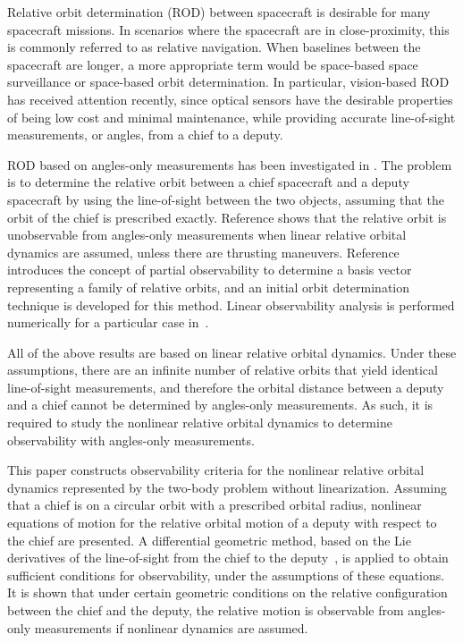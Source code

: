 Relative orbit determination (ROD) between spacecraft is desirable for many spacecraft missions. In scenarios where the spacecraft are in close-proximity, this is commonly referred to as relative navigation.
When baselines between the spacecraft are longer, a more appropriate term would be space-based space surveillance or space-based orbit determination. In particular, vision-based ROD has received attention recently, since optical sensors have the desirable properties of being low cost and minimal maintenance, while providing accurate line-of-sight measurements, or angles, from a chief to a deputy.

ROD based on angles-only measurements has been investigated in \cite{WofGelITAES09,PatLovPASFMM12}. The problem is to determine the relative orbit between a chief spacecraft and a deputy spacecraft by using the line-of-sight between the two objects, assuming that the orbit of the chief is prescribed exactly. Reference \cite{WofGelITAES09} shows that the relative orbit is unobservable from angles-only measurements when linear relative orbital dynamics are assumed, unless there are thrusting maneuvers. Reference~\cite{PatLovPASFMM12} introduces the concept of partial observability to determine a basis vector representing a family of relative orbits, and an initial orbit determination technique is developed for this method. Linear observability analysis is performed numerically for a particular case in~\cite{YimCraPASMM04}. 

All of the above results are based on linear relative orbital dynamics.
Under these assumptions, there are an infinite number of relative orbits that yield identical line-of-sight measurements, and therefore the orbital distance between a deputy and a chief cannot be determined by angles-only measurements. As such, it is required to study the nonlinear relative orbital dynamics to determine observability with angles-only measurements. 


This paper constructs observability criteria for the nonlinear relative orbital dynamics represented by the two-body problem without linearization. Assuming that a chief is on a circular orbit with a prescribed orbital radius, nonlinear equations of motion for the relative orbital motion of a deputy with respect to the chief are presented. A differential geometric method, based on the Lie derivatives of the line-of-sight from the chief to the deputy~\cite{HerKreITAC77}, is applied to obtain sufficient conditions for observability, under the assumptions of these equations. It is shown that under certain geometric conditions on the relative configuration between the chief and the deputy, the relative motion is observable from angles-only measurements if nonlinear dynamics are assumed.

